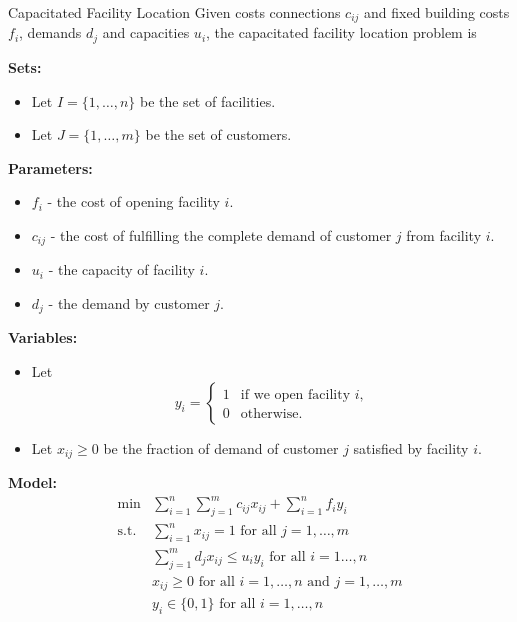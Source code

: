 \begin{general}{Capacitated Facility Location}{\npcomplete}
Given costs connections $c_{ij}$ and fixed building costs $f_i$, demands $d_j$ and capacities $u_i$, the capacitated facility location problem is 

\noindent \textbf{Sets:}
\begin{itemize}
\item Let $I = \{1,\dots, n\}$ be the set of facilities.
\item Let $J = \{1, \dots, m\}$ be the set of customers.
\end{itemize}

\noindent \textbf{Parameters:}
\begin{itemize}
\item $f_i$ - the cost of opening facility $i$.
\item $c_{ij}$ - the cost of fulfilling the complete demand of customer $j$ from facility $i$.
\item $u_{i}$ - the capacity of facility $i$.
\item $d_{j}$ - the demand by customer $j$.
\end{itemize}

\noindent \textbf{Variables:}
\begin{itemize}
\item Let 
\begin{equation*}
y_{i} = \begin{cases}
1 & \text{if we open facility $i$,}\\
0 & \text{otherwise.}
\end{cases}
\end{equation*}
\item Let $x_{ij} \geq 0$ be the fraction of demand of customer $j$ satisfied by facility $i$.
\end{itemize}

\noindent  \textbf{Model:}
\begin{align}
\min & \displaystyle\sum_{i=1}^n\sum_{j=1}^mc_{ij}x_{ij}+\sum_{i=1}^nf_iy_i \tag{total cost}\\
\text{s.t.} & \displaystyle\sum_{i=1}^nx_{ij}=1 \text{ for all }j=1,\dots,m \tag{assign demand to facility}\\
& \displaystyle \sum_{j=1}^md_jx_{ij}\leqslant u_iy_i\text{ for all }i=1\dots,n \tag{capacity of facility $i$}\\
&x_{ij}\geqslant0\text{ for all }i=1,\dots,n \text{ and }j=1,\dots,m \tag{nonnegative fraction of demand satisfied}\\
&y_i\in\{0,1\}\text{ for all } i=1,\dots,n \tag{open/not open facility}
\end{align}

\end{general}


